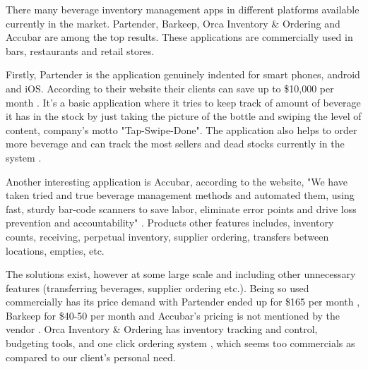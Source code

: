 There many beverage inventory management apps in different platforms available currently in the market. 
Partender, Barkeep, Orca Inventory \& Ordering and Accubar are among the top results. These applications are 
commercially used in bars, restaurants and retail stores.  

 Firstly, Partender is the application genuinely indented for smart phones, android and iOS. According to their 
 website their clients can save up to  \$10,000 per month \cite{buzztime} . It's a basic application where 
 it tries to keep track of amount of beverage it has in the stock by just taking the picture of the bottle and 
 swiping the level of content, company's motto "Tap-Swipe-Done". The application also helps to order more 
 beverage and can track the most sellers and dead stocks currently in the system \cite{accubar}.

Another interesting application is Accubar, according to the website, "We have taken tried and true beverage 
management methods and automated them, using fast, sturdy bar-code scanners to save labor, eliminate error points
 and drive loss prevention and accountability" \cite{partender}.  Products other features includes, inventory 
 counts, receiving, perpetual inventory, supplier ordering, transfers between locations, empties, etc. 

The solutions exist, however at some large scale and including other unnecessary features (transferring beverages,
 supplier ordering etc.). Being so used commercially has its price demand with Partender ended up for \$165 per 
 month \cite{partender}, Barkeep for \$40-50 per month and Accubar's pricing is not mentioned by the vendor 
 \cite{eicher}. Orca Inventory \& Ordering has inventory tracking and control, budgeting tools, and one click 
 ordering system \cite{orca}, which seems too commercials as compared to our client's personal need. 
